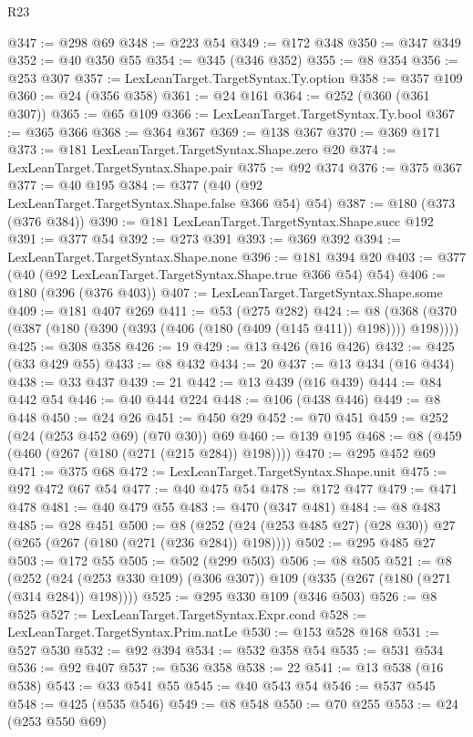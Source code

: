 \begin{lexlean}{R23}
\begin{coremodule}
@347 := @298 @69
@348 := @223 @54
@349 := @172 @348
@350 := @347 @349
@352 := @40 @350 @55
@354 := @345 (@346 @352)
@355 := @8 @354
@356 := @253 @307
@357 := LexLeanTarget.TargetSyntax.Ty.option
@358 := @357 @109
@360 := @24 (@356 @358)
@361 := @24 @161
@364 := @252 (@360 (@361 @307))
@365 := @65 @109
@366 := LexLeanTarget.TargetSyntax.Ty.bool
@367 := @365 @366
@368 := @364 @367
@369 := @138 @367
@370 := @369 @171
@373 := @181 LexLeanTarget.TargetSyntax.Shape.zero @20
@374 := LexLeanTarget.TargetSyntax.Shape.pair
@375 := @92 @374
@376 := @375 @367
@377 := @40 @195
@384 := @377 (@40 (@92 LexLeanTarget.TargetSyntax.Shape.false @366 @54) @54)
@387 := @180 (@373 (@376 @384))
@390 := @181 LexLeanTarget.TargetSyntax.Shape.succ @192
@391 := @377 @54
@392 := @273 @391
@393 := @369 @392
@394 := LexLeanTarget.TargetSyntax.Shape.none
@396 := @181 @394 @20
@403 := @377 (@40 (@92 LexLeanTarget.TargetSyntax.Shape.true @366 @54) @54)
@406 := @180 (@396 (@376 @403))
@407 := LexLeanTarget.TargetSyntax.Shape.some
@409 := @181 @407 @269
@411 := @53 (@275 @282)
@424 := @8 (@368 (@370 (@387 (@180 (@390 (@393 (@406 (@180 (@409 (@145 @411)) @198)))) @198))))
@425 := @308 @358
@426 := 19
@429 := @13 @426 (@16 @426)
@432 := @425 (@33 @429 @55)
@433 := @8 @432
@434 := 20
@437 := @13 @434 (@16 @434)
@438 := @33 @437
@439 := 21
@442 := @13 @439 (@16 @439)
@444 := @84 @442 @54
@446 := @40 @444 @224
@448 := @106 (@438 @446)
@449 := @8 @448
@450 := @24 @26
@451 := @450 @29
@452 := @70 @451
@459 := @252 (@24 (@253 @452 @69) (@70 @30)) @69
@460 := @139 @195
@468 := @8 (@459 (@460 (@267 (@180 (@271 (@215 @284)) @198))))
@470 := @295 @452 @69
@471 := @375 @68
@472 := LexLeanTarget.TargetSyntax.Shape.unit
@475 := @92 @472 @67 @54
@477 := @40 @475 @54
@478 := @172 @477
@479 := @471 @478
@481 := @40 @479 @55
@483 := @470 (@347 @481)
@484 := @8 @483
@485 := @28 @451
@500 := @8 (@252 (@24 (@253 @485 @27) (@28 @30)) @27 (@265 (@267 (@180 (@271 (@236 @284)) @198))))
@502 := @295 @485 @27
@503 := @172 @55
@505 := @502 (@299 @503)
@506 := @8 @505
@521 := @8
    (@252 (@24 (@253 @330 @109) (@306 @307)) @109 (@335 (@267 (@180 (@271 (@314 @284)) @198))))
@525 := @295 @330 @109 (@346 @503)
@526 := @8 @525
@527 := LexLeanTarget.TargetSyntax.Expr.cond
@528 := LexLeanTarget.TargetSyntax.Prim.natLe
@530 := @153 @528 @168
@531 := @527 @530
@532 := @92 @394
@534 := @532 @358 @54
@535 := @531 @534
@536 := @92 @407
@537 := @536 @358
@538 := 22
@541 := @13 @538 (@16 @538)
@543 := @33 @541 @55
@545 := @40 @543 @54
@546 := @537 @545
@548 := @425 (@535 @546)
@549 := @8 @548
@550 := @70 @255
@553 := @24 (@253 @550 @69)

\end{coremodule}
\end{lexlean}
